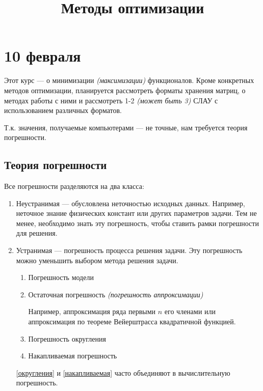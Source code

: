 



\title{Методы оптимизации}
\maketitle

\tableofcontents

\chapter{10 февраля}

Этот курс --- о минимизации \textit{(максимизации)} функционалов. Кроме конкретных методов оптимизации, планируется рассмотреть форматы хранения матриц, о методах работы с ними и рассмотреть 1-2 \textit{(может быть 3)} СЛАУ с использованием различных форматов.

Т.к. значения, получаемые компьютерами --- не точные, нам требуется теория погрешности.

\section{Теория погрешности}

Все погрешности разделяются на два класса:

\begin{enumerate}
    \item Неустранимая --- обусловлена неточностью исходных данных. Например, неточное знание физических констант или других параметров задачи. Тем не менее, необходимо знать эту погрешность, чтобы ставить рамки погрешности для решения.
    \item Устранимая --- погрешность процесса решения задачи. Эту погрешность можно уменьшить выбором метода решения задачи.
          \begin{enumerate}
              \item Погрешность модели
              \item Остаточная погрешность \textit{(погрешность аппроксимации)}

                    Например, аппроксимация ряда первыми \(n\) его членами или аппроксимация по теореме Вейерштрасса квадратичной функцией.

              \item Погрешность округления \label{округления}
              \item Накапливаемая погрешность \label{накапливаемая}
          \end{enumerate}

          \ref{округления} и \ref{накапливаемая} часто объединяют в вычислительную погрешность.
\end{enumerate}

